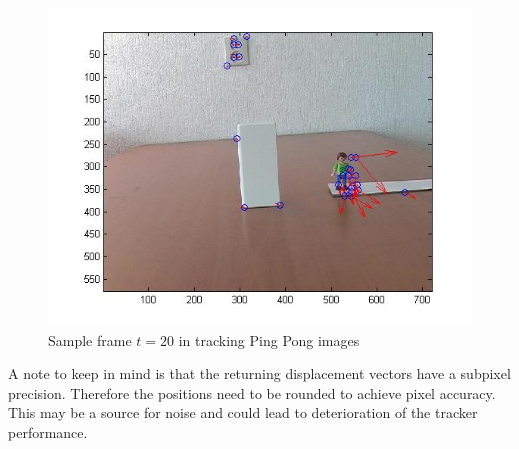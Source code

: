 \documentclass[11pt]{article}
\begin{document}
\begin{figure}[H] \centering
	\includegraphics[width=.8\textwidth]{imgs/tracker_person.jpg}
	\caption{Sample frame $t = 20$ in tracking Ping Pong images}
	\label{fig:trackerperson}
\end{figure}

A note to keep in mind is that the returning displacement vectors have a subpixel precision. Therefore the positions need to be rounded to achieve pixel accuracy. This may be a source for noise and could lead to deterioration of the tracker performance. 
\end{document}
